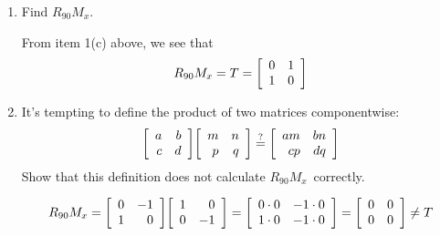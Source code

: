 \documentclass{letter}
\newcommand{\?}{\stackrel{?}{=}}
\newcommand\Que[1]{%
   \leavevmode\noindent
   #1
}
\newcommand\Ans[2][]{%
   \leavevmode\noindent
   {
       \begin{mdframed}[backgroundcolor=blue!10]
       #2
       \end{mdframed}
   }
}
\newenvironment{Mat}[1]{%
  \left[\begin{array}{*{#1}{r}}
}{%
  \end{array}\right]
}
\begin{document}
\begin{enumerate}
\begin{enumerate}[label=(\alph*)]
{\[    \]
    for all rows $i \in A$\ and columns $j \in B$. \\
    In general, if $A=A^T$\ and $B=B^T$\ then $AB=BA$.
    }
    \item \Que{
        Find $R_{90}M_x$.  
    }
    \Ans{
         From item 1(c) above, we see that
         \[
         R_{90}M_x = T =
         \begin{Mat}{2}
           0 & 1 \\
           1 & 0
         \end{Mat}
         \]
    }
    \item \Que{
        It's tempting to define the product of two matrices componentwise:
        \begin{align*}
            \begin{Mat}{2}
              a & b \\
              c & d
            \end{Mat}
            \begin{Mat}{2}
              m & n \\
              p & q
            \end{Mat}     
            \?
            \begin{Mat}{2}
              am & bn \\
              cp & dq
            \end{Mat}       
        \end{align*}
        Show that this definition does not calculate $R_{90}M_x$\ correctly.  
    }
    \Ans{
      \begin{align*}
        R_{90}M_x = 
        \begin{Mat}{2}
          0 & -1 \\
          1 & 0
        \end{Mat}
        \begin{Mat}{2}
          1 & 0 \\
          0 & -1
        \end{Mat}        
        =
        \begin{Mat}{2}
          0 \cdot 0 & -1\cdot 0 \\
          1 \cdot 0 & -1\cdot 0  
        \end{Mat}
        =
        \begin{Mat}{2}
          0 & 0 \\
          0 & 0
        \end{Mat}
        \not= T
      \end{align*}
    }
    \newpage

\end{enumerate}
\end{enumerate}
\end{document}
